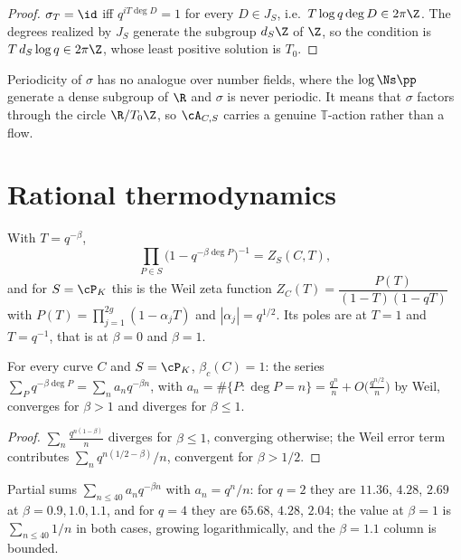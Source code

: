 \begin{proof}
$\sigma_T=\id$ iff $q^{iT\deg D}=1$ for every $D\in J_S$, i.e.\ $T\log q\deg D\in2\pi\Z$. The
degrees realized by $J_S$ generate the subgroup $d_S\Z$ of $\Z$, so the condition is
$T\,d_S\log q\in2\pi\Z$, whose least positive solution is $T_0$.
\end{proof}

\begin{remark}\label{XVII:rem:periodic}
Periodicity of $\sigma$ has no analogue over number fields, where the $\log\Ns\pp$ generate a
dense subgroup of $\R$ and $\sigma$ is never periodic. It means that $\sigma$ factors through
the circle $\R/T_0\Z$, so $\cA_{C,S}$ carries a genuine $\mathbb T$-action rather than a flow.
\end{remark}

\section{Rational thermodynamics}

\begin{proposition}\label{XVII:prop:zeta}
With $T=q^{-\beta}$,
\[
\prod_{P\in S}\bigl(1-q^{-\beta\deg P}\bigr)^{-1}=Z_S(C,T),
\]
and for $S=\cP_K$ this is the Weil zeta function \cite{Weil}
$Z_C(T)=\dfrac{P(T)}{(1-T)(1-qT)}$ with $P(T)=\prod_{j=1}^{2g}(1-\alpha_jT)$ and
$|\alpha_j|=q^{1/2}$. Its poles are at $T=1$ and $T=q^{-1}$, that is at $\beta=0$ and
$\beta=1$.
\end{proposition}

\begin{corollary}\label{XVII:cor:betac}
For every curve $C$ and $S=\cP_K$, $\beta_c(C)=1$: the series
$\sum_{P}q^{-\beta\deg P}=\sum_n a_nq^{-\beta n}$, with
$a_n=\#\{P:\deg P=n\}=\frac{q^n}{n}+O\bigl(\frac{q^{n/2}}{n}\bigr)$ by Weil, converges for
$\beta>1$ and diverges for $\beta\le1$.
\end{corollary}

\begin{proof}
$\sum_n\frac{q^{n(1-\beta)}}{n}$ diverges for $\beta\le1$, converging otherwise; the Weil
error term contributes $\sum_nq^{n(1/2-\beta)}/n$, convergent for $\beta>1/2$.
\end{proof}

\begin{remark}\label{XVII:rem:numbetac}
Partial sums $\sum_{n\le40}a_nq^{-\beta n}$ with $a_n=q^n/n$: for $q=2$ they are $11.36$,
$4.28$, $2.69$ at $\beta=0.9,1.0,1.1$, and for $q=4$ they are $65.68$, $4.28$, $2.04$; the
value at $\beta=1$ is $\sum_{n\le40}1/n$ in both cases, growing logarithmically, and the
$\beta=1.1$ column is bounded.
\end{remark}

